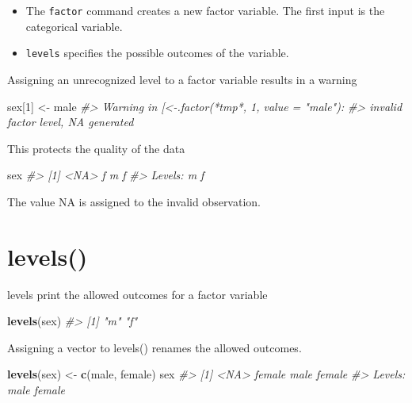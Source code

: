 \documentclass[
]{book}
\newenvironment{Shaded}{\begin{snugshade}}{\end{snugshade}}
\newcommand{\CommentTok}[1]{\textcolor[rgb]{0.56,0.35,0.01}{\textit{#1}}}
\newcommand{\DecValTok}[1]{\textcolor[rgb]{0.00,0.00,0.81}{#1}}
\newcommand{\FunctionTok}[1]{\textcolor[rgb]{0.13,0.29,0.53}{\textbf{#1}}}
\newcommand{\NormalTok}[1]{#1}
\newcommand{\OtherTok}[1]{\textcolor[rgb]{0.56,0.35,0.01}{#1}}
\newcommand{\StringTok}[1]{\textcolor[rgb]{0.31,0.60,0.02}{#1}}
\begin{document}
\begin{itemize}
\item
  The \texttt{factor} command creates a new factor variable. The first input
  is the categorical variable.
\item
  \texttt{levels} specifies the possible outcomes of the variable.
\end{itemize}

Assigning an unrecognized level to a factor variable results in a
warning

\begin{Shaded}
\begin{Highlighting}[]
\NormalTok{sex[}\DecValTok{1}\NormalTok{] }\OtherTok{\textless{}{-}} \StringTok{\textquotesingle{}male\textquotesingle{}}
\CommentTok{\#\textgreater{} Warning in \textasciigrave{}[\textless{}{-}.factor\textasciigrave{}(\textasciigrave{}*tmp*\textasciigrave{}, 1, value = "male"):}
\CommentTok{\#\textgreater{} invalid factor level, NA generated}
\end{Highlighting}
\end{Shaded}

This protects the quality of the data

\begin{Shaded}
\begin{Highlighting}[]
\NormalTok{sex}
\CommentTok{\#\textgreater{} [1] \textless{}NA\textgreater{} f    m    f   }
\CommentTok{\#\textgreater{} Levels: m f}
\end{Highlighting}
\end{Shaded}

The value NA is assigned to the invalid observation.

\section*{levels()}\label{levels}

levels print the allowed outcomes for a factor variable

\begin{Shaded}
\begin{Highlighting}[]
\FunctionTok{levels}\NormalTok{(sex)}
\CommentTok{\#\textgreater{} [1] "m" "f"}
\end{Highlighting}
\end{Shaded}

Assigning a vector to levels() renames the allowed outcomes.

\begin{Shaded}
\begin{Highlighting}[]
\FunctionTok{levels}\NormalTok{(sex) }\OtherTok{\textless{}{-}} \FunctionTok{c}\NormalTok{(}\StringTok{\textquotesingle{}male\textquotesingle{}}\NormalTok{, }\StringTok{\textquotesingle{}female\textquotesingle{}}\NormalTok{)}
\NormalTok{sex}
\CommentTok{\#\textgreater{} [1] \textless{}NA\textgreater{}   female male   female}
\CommentTok{\#\textgreater{} Levels: male female}
\end{Highlighting}
\end{Shaded}
\end{document}
